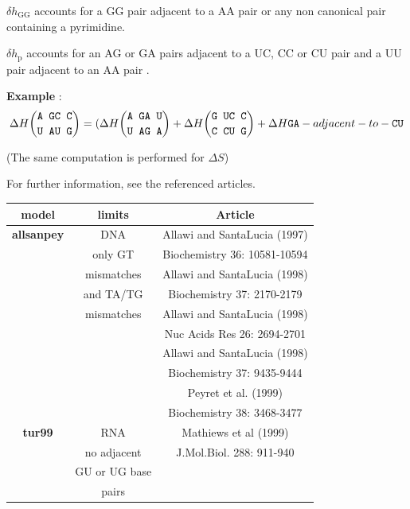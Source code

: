 \documentclass{article}
\begin{document}
$\delta{}h_\mathrm{GG}$ accounts for a GG pair adjacent to a AA pair or any non canonical pair containing a pyrimidine.

$\delta{}h_\mathrm{p}$ accounts for an AG or GA pairs adjacent to a UC, CC or CU pair and a UU pair adjacent to an AA pair .

\textbf{Example} :
\begin{multline*}
\Delta H {\mbox{\texttt{A GC C}} \choose \mbox{\texttt{U AU G}}} =
( \Delta H {\mbox{\texttt{A GA U}} \choose \mbox{\texttt{U AG A}}} + 
\Delta H {\mbox{\texttt{G UC C}} \choose \mbox{\texttt{C CU G}}} +
\Delta H {\mbox{\texttt{GA}} -adjacent-to- \mbox{\texttt{CU}} } \\
\end{multline*}

       (The same computation is performed for $\Delta S$)
       
For further information, see the referenced articles.

\begin{table}[hc]
\begin{tabular}[h]{| c | c | c |}
\textbf{model} & \textbf{limits} & \textbf{Article} \\
 \hline
\textbf{allsanpey} & DNA & Allawi and SantaLucia (1997) \\
 & only GT & Biochemistry 36: 10581-10594 \\
 & mismatches & Allawi and SantaLucia (1998) \\
 & and TA/TG & Biochemistry 37: 2170-2179 \\
 & mismatches & Allawi and SantaLucia (1998) \\
 & & Nuc Acids Res 26: 2694-2701 \\
 & & Allawi and SantaLucia (1998) \\
 & & Biochemistry 37: 9435-9444 \\
 & & Peyret et al. (1999) \\
 & & Biochemistry 38: 3468-3477\\
 \hline
\textbf{tur99} & RNA & Mathiews et al (1999) \\
 & no adjacent & J.Mol.Biol.  288: 911-940 \\
 & GU or UG base & \\
 &  pairs & \\
 \hline
\end{tabular}
\end{table}
\end{document}
